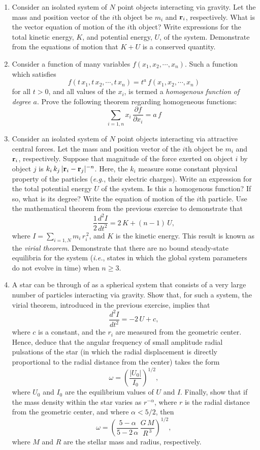 {\small
\renewcommand{\theenumi}{2.\arabic{enumi}}
\begin{enumerate}
\item Consider an isolated system of $N$ point objects interacting via
gravity. Let the mass and position vector of the $i$th object be
 $m_i$ and  ${\bf r}_i$, respectively. What is  the vector equation
 of motion of the $i$th object? Write expressions for the total
 kinetic energy, $K$, and potential energy, $U$, of the system.
 Demonstrate from the equations of motion  that $K+U$ is a conserved quantity.
 
 \item Consider a function of many variables $f(x_1,x_2,\cdots,x_n)$. 
 Such a function which satisfies
 $$
 f(t\,x_1, t\,x_2,\cdots,t\,x_n) = t^a\,f(x_1,x_2,\cdots,x_n)
 $$
 for all $t>0$, and all values of the $x_i$, is termed a {\em homogenous function of degree $a$}. 
 Prove the following theorem regarding homogeneous functions:
 $$
 \sum_{i=1,n} x_i\,\frac{\partial f}{\partial x_i} = a\,f
 $$
 
  \item Consider an isolated system of $N$ point objects interacting via
attractive central forces. Let the mass and position vector of the $i$th object be
 $m_i$ and  ${\bf r}_i$, respectively. Suppose that magnitude of the force exerted on object $i$ by
object $j$ is $k_i\,k_j\,|{\bf r}_i-{\bf r}_j|^{-n}$. Here, the $k_i$ measure
some constant physical
property of the particles ({\em e.g.}, their electric charges). Write
an expression for the total potential energy $U$ of the system. Is
this a homogenous function? If so, what is its degree?
Write the equation of motion of the $i$th particle. Use the mathematical
theorem from the previous exercise to demonstrate that
$$
\frac{1}{2}\frac{d^2 I}{dt^2} = 2\,K + (n-1)\,U,
$$
where $I=\sum_{i=1,N} m_i\, r_i^{\,2}$, and $K$ is the kinetic energy.
This result is known as the {\em virial theorem}.
Demonstrate that there are no bound steady-state equilibria for the system ({\em i.e.}, states in which
the global system parameters do not evolve in time)
when $n\geq 3$. 
 
\item A star can be through of as a spherical system that consists of a very large number of particles interacting
via gravity.  Show that, for such a system, the virial theorem, introduced in the previous exercise, implies that
$$
\frac{d^2 I}{dt^2} = -2\,U + c,
$$
where $c$ is a constant, and the $r_i$ are measured from the geometric center. Hence, deduce that the angular frequency of small amplitude radial pulsations
of the star (in which the radial displacement is directly proportional to the radial distance from the center) takes the form
$$
\omega = \left(\frac{|U_0|}{I_0}\right)^{1/2},
$$
where $U_0$ and $I_0$ are the equilibrium values of $U$ and $I$. Finally, show that if the mass
density within the star varies as $r^{-\alpha}$, where $r$ is the radial distance from the geometric center, and where $\alpha<5/2$, then
$$
\omega = \left(\frac{5-\alpha}{5-2\,\alpha}\,\frac{G\,M}{R^{\,3}}\right)^{1/2},
$$
where $M$ and $R$ are the stellar mass and radius, respectively.
 

\end{enumerate}}
